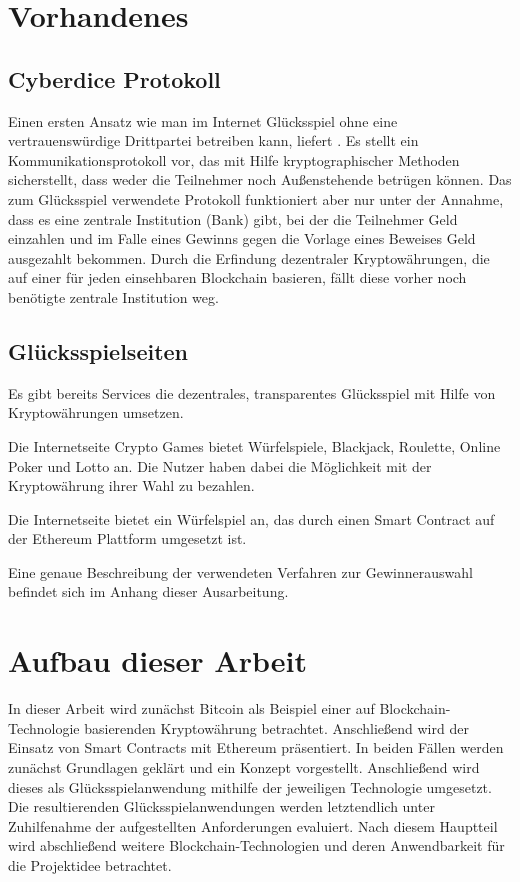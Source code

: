 \section{Vorhandenes}

\subsection{Cyberdice Protokoll}

Einen ersten Ansatz wie man im Internet Glücksspiel ohne eine vertrauenswürdige Drittpartei betreiben kann, liefert \cite{cyberdice_paper}. Es stellt ein Kommunikationsprotokoll vor, das mit Hilfe kryptographischer Methoden sicherstellt, dass weder die Teilnehmer noch Außenstehende betrügen können. Das zum Glücksspiel verwendete Protokoll funktioniert aber nur unter der Annahme, dass es eine zentrale Institution (Bank) gibt, bei der die Teilnehmer Geld einzahlen und im Falle eines Gewinns gegen die Vorlage eines Beweises Geld ausgezahlt bekommen. Durch die Erfindung dezentraler Kryptowährungen, die auf einer für jeden einsehbaren Blockchain basieren, fällt diese vorher noch benötigte zentrale Institution weg.


\subsection{Glücksspielseiten}
Es gibt bereits Services die dezentrales, transparentes Glücksspiel mit Hilfe von Kryptowährungen umsetzen.

Die Internetseite Crypto Games \cite{crypto_games} bietet Würfelspiele, Blackjack, Roulette, Online Poker und Lotto an. Die Nutzer haben dabei die Möglichkeit mit der Kryptowährung ihrer Wahl zu bezahlen.

Die Internetseite \cite{vdice} bietet ein Würfelspiel an, das durch einen Smart Contract auf der Ethereum Plattform umgesetzt ist.

Eine genaue Beschreibung der verwendeten Verfahren zur Gewinnerauswahl befindet sich im Anhang dieser Ausarbeitung.

\section{Aufbau dieser Arbeit}
In dieser Arbeit wird zunächst Bitcoin als Beispiel einer auf Blockchain-Technologie basierenden Kryptowährung betrachtet. Anschließend wird der Einsatz von Smart Contracts mit Ethereum präsentiert. In beiden Fällen werden zunächst Grundlagen geklärt und ein Konzept vorgestellt. Anschließend wird dieses als Glücksspielanwendung mithilfe der jeweiligen Technologie umgesetzt. Die resultierenden Glücksspielanwendungen werden letztendlich unter Zuhilfenahme der aufgestellten Anforderungen evaluiert. Nach diesem Hauptteil wird abschließend weitere Blockchain-Technologien und deren Anwendbarkeit für die Projektidee betrachtet.